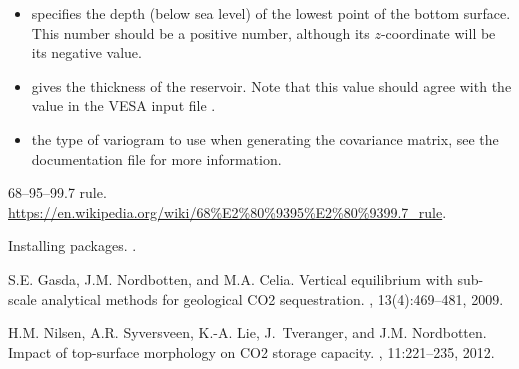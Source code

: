 \documentclass[11pt,a4paper]{amsart}
\begin{document}
\begin{itemize}
\item {} specifies the depth (below sea level) of
  the lowest point of 
  the bottom surface. This number should be a positive number, although its
  $z$-coordinate will be its negative value.

\item {} gives the thickness of the reservoir.
  Note that this value should agree with the value in the VESA input file .

\item {} the type of variogram to use when
  generating the covariance matrix, see the documentation file
  \docVariogram{} for more information.

\end{itemize}


\begin{thebibliography}{1}

68–95–99.7 rule.
\newblock
  {\url{https://en.wikipedia.org/wiki/68%E2%80%9395%E2%80%9399.7_rule}}.

Installing packages.
.

S.E. Gasda, J.M. Nordbotten, and M.A. Celia.
\newblock Vertical equilibrium with sub-scale analytical methods for geological
  {CO2} sequestration.
, 13(4):469--481, 2009.

H.M. Nilsen, A.R. Syversveen, K.-A. Lie, J.~Tveranger, and J.M. Nordbotten.
\newblock Impact of top-surface morphology on {CO2} storage capacity.
, 11:221--235,
  2012.

\end{thebibliography}
\end{document}
